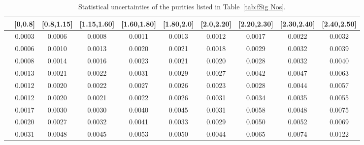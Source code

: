\begin{table}
\footnotesize
\centering
\begin{tabular}{c|c|c|c|c|c|c|c|c|c}
  \hline
   &[0,0.8] &[0.8,1.15] &[1.15,1.60] &[1.60,1.80] &[1.80,2.0] &[2.0,2.20] &[2.20,2.30] &[2.30,2.40] &[2.40,2.50] \\
  \hline
  [0,0.8] &0.0003 &0.0006 &0.0008 &0.0011 &0.0013 &0.0012 &0.0017 &0.0022 &0.0032 \\
  \hline
  [0.8,1.15] &0.0006 &0.0010 &0.0013 &0.0020 &0.0021 &0.0018 &0.0029 &0.0032 &0.0039 \\
  \hline
  [1.15,1.60] &0.0008 &0.0014 &0.0016 &0.0023 &0.0021 &0.0020 &0.0028 &0.0032 &0.0040 \\
  \hline
  [1.60,1.80] &0.0013 &0.0021 &0.0022 &0.0031 &0.0029 &0.0027 &0.0042 &0.0047 &0.0063 \\
  \hline
  [1.80,2.0] &0.0012 &0.0020 &0.0022 &0.0027 &0.0026 &0.0023 &0.0028 &0.0044 &0.0057 \\
  \hline
  [2.0,2.20] &0.0012 &0.0020 &0.0021 &0.0022 &0.0026 &0.0031 &0.0034 &0.0035 &0.0055 \\
  \hline
  [2.20,2.30] &0.0017 &0.0030 &0.0030 &0.0040 &0.0045 &0.0031 &0.0058 &0.0048 &0.0075 \\
  \hline
  [2.30,2.40] &0.0020 &0.0027 &0.0032 &0.0041 &0.0033 &0.0029 &0.0050 &0.0052 &0.0069 \\
  \hline
  [2.40,2.50] &0.0031 &0.0048 &0.0045 &0.0053 &0.0050 &0.0044 &0.0065 &0.0074 &0.0122 \\
  \hline
\end{tabular}
\caption{Statistical uncertainties of the purities listed in
  Table~\ref{tab:fSig Nos}.}
\label{tab:fSig error Nos}
\end{table}

